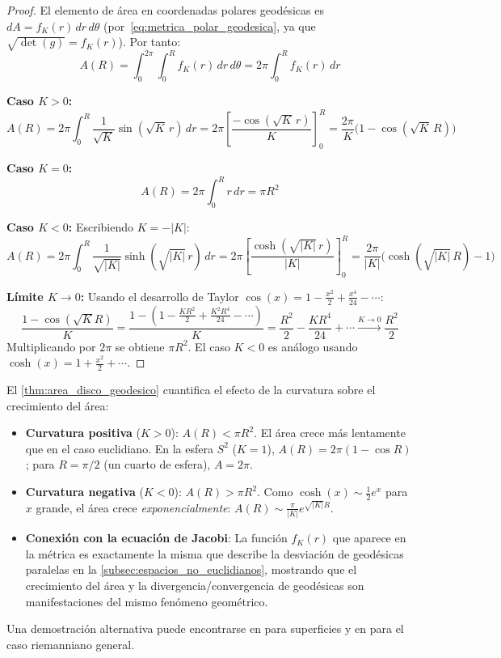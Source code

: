 \begin{proof}
El elemento de área en coordenadas polares geodésicas es $dA = f_K(r) \, dr \, d\theta$ (por~\eqref{eq:metrica_polar_geodesica}, ya que $\sqrt{\det(g)} = f_K(r)$). Por tanto:
\[
A(R) = \int_0^{2\pi} \int_0^R f_K(r) \, dr \, d\theta = 2\pi \int_0^R f_K(r) \, dr
\]

\textbf{Caso $K > 0$:}
\[
A(R) = 2\pi \int_0^R \frac{1}{\sqrt{K}} \sin(\sqrt{K} \, r) \, dr = 2\pi \left[ \frac{-\cos(\sqrt{K} \, r)}{K} \right]_0^R = \frac{2\pi}{K} \bigl(1 - \cos(\sqrt{K} \, R)\bigr)
\]

\textbf{Caso $K = 0$:}
\[
A(R) = 2\pi \int_0^R r \, dr = \pi R^2
\]

\textbf{Caso $K < 0$:} Escribiendo $K = -|K|$:
\[
A(R) = 2\pi \int_0^R \frac{1}{\sqrt{|K|}} \sinh(\sqrt{|K|} \, r) \, dr = 2\pi \left[ \frac{\cosh(\sqrt{|K|} \, r)}{|K|} \right]_0^R = \frac{2\pi}{|K|} \bigl(\cosh(\sqrt{|K|} \, R) - 1\bigr)
\]

\textbf{Límite $K \to 0$:} Usando el desarrollo de Taylor $\cos(x) = 1 - \frac{x^2}{2} + \frac{x^4}{24} - \cdots$:
\[
\frac{1 - \cos(\sqrt{K} R)}{K} = \frac{1 - \left(1 - \frac{KR^2}{2} + \frac{K^2 R^4}{24} - \cdots\right)}{K} = \frac{R^2}{2} - \frac{K R^4}{24} + \cdots \xrightarrow{K \to 0} \frac{R^2}{2}
\]
Multiplicando por $2\pi$ se obtiene $\pi R^2$. El caso $K < 0$ es análogo usando $\cosh(x) = 1 + \frac{x^2}{2} + \cdots$.
\end{proof}

\begin{remark}\label{rem:area_disco_interpretacion}
El \autoref{thm:area_disco_geodesico} cuantifica el efecto de la curvatura sobre el crecimiento del área:
\begin{itemize}
    \item \textbf{Curvatura positiva} ($K > 0$): $A(R) < \pi R^2$. El área crece más lentamente que en el caso euclidiano. En la esfera $S^2$ ($K = 1$), $A(R) = 2\pi(1 - \cos R)$; para $R = \pi/2$ (un cuarto de esfera), $A = 2\pi$.
    \item \textbf{Curvatura negativa} ($K < 0$): $A(R) > \pi R^2$. Como $\cosh(x) \sim \frac{1}{2}e^x$ para $x$ grande, el área crece \textit{exponencialmente}: $A(R) \sim \frac{\pi}{|K|} e^{\sqrt{|K|} R}$.
    \item \textbf{Conexión con la ecuación de Jacobi}: La función $f_K(r)$ que aparece en la métrica es exactamente la misma que describe la desviación de geodésicas paralelas en la \autoref{subsec:espacios_no_euclidianos}, mostrando que el crecimiento del área y la divergencia/convergencia de geodésicas son manifestaciones del mismo fenómeno geométrico.
\end{itemize}
Una demostración alternativa puede encontrarse en \citet[Capítulo~4, Sección~4.6]{do1976differential} para superficies y en \citet[Teorema~11.9]{lee2018introduction} para el caso riemanniano general.
\end{remark}

